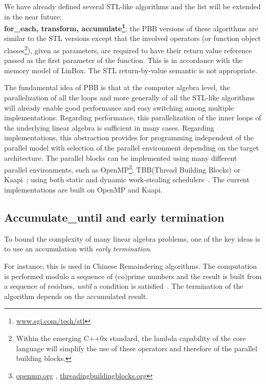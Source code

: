 \documentclass{article}
\newcommand{\linbox}{{\sc LinBox}\xspace}
\newcommand{\kaapi}{{\sc Kaapi}\xspace}
\newcommand{\Accumulatewhile}{ \textbf{Accumulate\_until} }
\begin{document}
  We have already defined several STL-like algorithms and the list
  will be extended in the near future:\\
  {\bf for\_each, transform,
    accumulate\footnote{\url{www.sgi.com/tech/stl}}}: the PBB versions of
  these algorithms are similar to the STL versions except that the
  involved operators (or function object classes\footnote{Within the
    emerging C++0x standard, the lambda capability of the core language
    will simplify the use of these operators and therefore of the parallel
    building blocks.}), given as parameters, are required to have their
  return value reference passed as the first parameter of the
  function. This is in accordance with the memory model of \linbox. The
  STL return-by-value semantic is not appropriate.
  
  The fundamental idea of PBB is that at the computer algebra
  level, the parallelization of all the loops and more generally of all
  the STL-like algorithms will already enable good performance and
  easy switching among multiple implementations.
  Regarding performance, this parallelization of the inner loops of
  the underlying linear algebra is sufficient in many cases.
  Regarding implementations, this
  abstraction provides for programming independent of the
  parallel model with selection of the parallel environment
  depending on the target architecture.
  The parallel blocks can be implemented using many different parallel
  environments, such as
  OpenMP\footnote{\url{openmp.org} \cite{Chapman:2007:openmp},
    \url{threadingbuildingblocks.org}}; 
  TBB\footnotemark[7] (Thread Building Blocks)
   or
  \kaapi~\cite{inproceedingsgautier.gbp_ktsrsf_07}; using
  both static and dynamic work-stealing
  schedulers~\cite{con-traore.trmgb_08}.
  The current implementations are built on OpenMP and \kaapi.

\subsection{\Accumulatewhile and early termination}
To bound the complexity of many linear algebra problems, one of the
key ideas is to use an accumulation with {\em early termination}.

For instance, this is used in Chinese Remaindering algorithms. The
computation is performed modulo a sequence of (co)prime numbers and
the result is built from a sequence of residues, {\em until} a
condition is satisfied~\cite{jgd:2010:crt}. 
The termination of the algorithm depends on the accumulated 
result.
  
\end{document}
